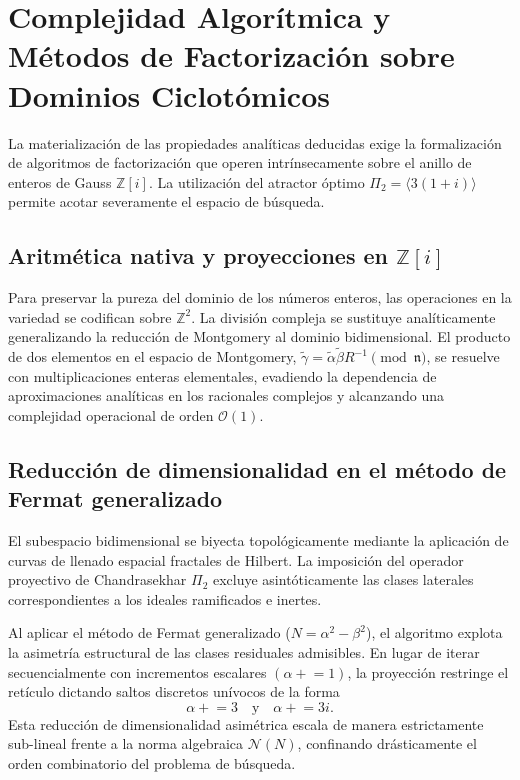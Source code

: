 \documentclass{article}
\numberwithin{equation}{section}
\theoremstyle{plain}
\theoremstyle{definition}
\begin{document}
\section{Complejidad Algorítmica y Métodos de Factorización sobre Dominios Ciclotómicos}
\label{sec:implementacion}

La materialización de las propiedades analíticas deducidas exige la formalización de algoritmos de factorización que operen intrínsecamente sobre el anillo de enteros de Gauss $\mathbb{Z}[i]$. La utilización del atractor óptimo $\Pi_2 = \langle 3(1+i) \rangle$ permite acotar severamente el espacio de búsqueda.

\subsection{Aritmética nativa y proyecciones en \texorpdfstring{$\mathbb{Z}[i]$}{Z[i]}}

Para preservar la pureza del dominio de los números enteros, las operaciones en la variedad se codifican sobre $\mathbb{Z}^2$. La división compleja se sustituye analíticamente generalizando la reducción de Montgomery al dominio bidimensional. El producto de dos elementos en el espacio de Montgomery, $\tilde{\gamma} = \tilde{\alpha} \tilde{\beta} R^{-1} \pmod{\mathfrak{n}}$, se resuelve con multiplicaciones enteras elementales, evadiendo la dependencia de aproximaciones analíticas en los racionales complejos y alcanzando una complejidad operacional de orden $\mathcal{O}(1)$.

\subsection{Reducción de dimensionalidad en el método de Fermat generalizado}

El subespacio bidimensional se biyecta topológicamente mediante la aplicación de curvas de llenado espacial fractales de Hilbert. La imposición del operador proyectivo de Chandrasekhar $\Pi_2$ excluye asintóticamente las clases laterales correspondientes a los ideales ramificados e inertes. 

Al aplicar el método de Fermat generalizado ($N = \alpha^2 - \beta^2$), el algoritmo explota la asimetría estructural de las clases residuales admisibles. En lugar de iterar secuencialmente con incrementos escalares $(\alpha \mathrel{+}= 1)$, la proyección restringe el retículo dictando saltos discretos unívocos de la forma
\begin{equation}
    \alpha \mathrel{+}= 3 \quad \text{y} \quad \alpha \mathrel{+}= 3i.
\end{equation}
Esta reducción de dimensionalidad asimétrica escala de manera estrictamente sub-lineal frente a la norma algebraica $\mathcal{N}(N)$, confinando drásticamente el orden combinatorio del problema de búsqueda.
\end{document}
